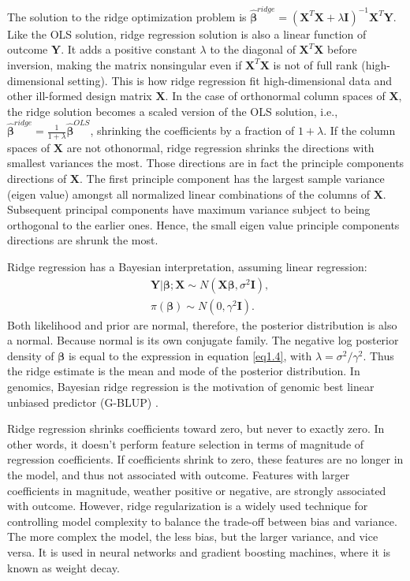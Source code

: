 The solution to the ridge optimization problem is $\hat{\bm{\beta}}^{ridge}=(\bm{X}^T\bm{X}+\lambda \bm{I})^{-1}\bm{X}^T\bm{Y}$. Like the OLS solution, ridge regression solution is also a linear function of outcome $\bm{Y}$. It adds a positive constant $\lambda$ to the diagonal of $\bm{X}^T\bm{X}$ before inversion, making the matrix nonsingular even if $\bm{X}^T\bm{X}$ is not of full rank (high-dimensional setting). This is how ridge regression fit high-dimensional data and other ill-formed design matrix $\bm{X}$. In the case of orthonormal column spaces of $\bm{X}$, the ridge solution becomes a scaled version of the OLS solution, i.e., $\hat{\bm{\beta}}^{ridge}=\frac{1}{1+\lambda}\hat{\bm{\beta}}^{OLS}$, shrinking the coefficients by a fraction of $1+\lambda$. If the column spaces of $\bm{X}$ are not othonormal, ridge regression shrinks the directions with smallest variances the most. Those directions are in fact the principle components directions of $\bm{X}$. The first principle component has the largest sample variance (eigen value) amongst all normalized linear combinations of the columns of $\bm{X}$. Subsequent principal components have maximum variance subject to being orthogonal to the earlier ones. Hence, the small eigen value principle components directions are shrunk the most. 

Ridge regression has a Bayesian interpretation, assuming linear regression:
\begin{align*}
    &\bm{Y}|\bm{\beta};\bm{X} \sim N(\bm{X\beta}, \sigma^2\bm{I}), \\
    &\pi(\bm{\beta}) \sim N(0, \gamma^2\bm{I}).
\end{align*}
Both likelihood and prior are normal, therefore, the posterior distribution is also a normal. Because normal is its own conjugate family. The negative log posterior density of $\bm{\beta}$ is equal to the expression in equation \eqref{eq1.4}, with $\lambda=\sigma^2/\gamma^2$. Thus the ridge estimate is the mean and mode of the posterior distribution. In genomics, Bayesian ridge regression is the motivation of genomic best linear unbiased predictor (G-BLUP) \citep{de2013prediction}. 

Ridge regression shrinks coefficients toward zero, but never to exactly zero. In other words, it doesn't perform feature selection in terms of magnitude of regression coefficients. If coefficients shrink to zero, these features are no longer in the model, and thus not associated with outcome. Features with larger coefficients in magnitude, weather positive or negative, are strongly associated with outcome. However, ridge regularization is a widely used technique for controlling model complexity to balance the trade-off between bias and variance. The more complex the model, the less bias, but the larger variance, and vice versa. It is used in neural networks and gradient boosting machines, where it is known as weight decay.    

